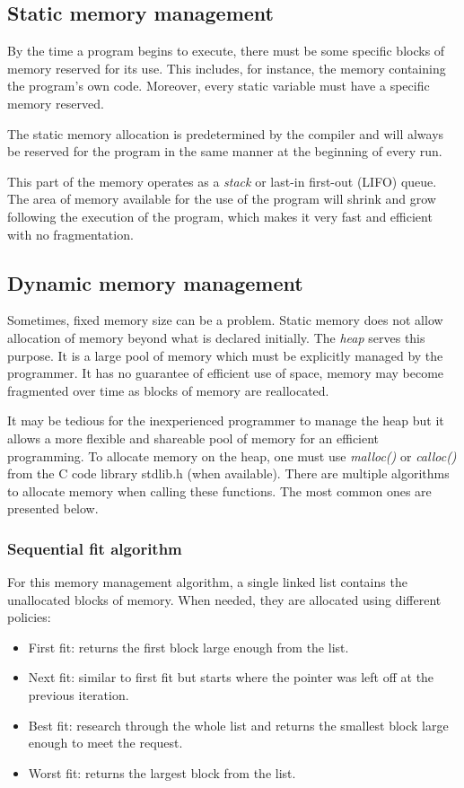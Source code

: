 \subsection{Static memory management}
By the time a program begins to execute, there must be some specific blocks of memory reserved for its use.
This includes, for instance, the memory containing the program's own code.
Moreover, every static variable must have a specific memory reserved.

The static memory allocation is predetermined by the compiler
    and will always be reserved for the program in the same manner at the beginning of every run.

This part of the memory operates as a \textit{stack} or last-in first-out (LIFO) queue.
The area of memory available for the use of the program will shrink and grow following the execution of the program,
which makes it very fast and efficient with no fragmentation.

\subsection{Dynamic memory management}
Sometimes, fixed memory size can be a problem.
Static memory does not allow allocation of memory beyond what is declared initially.
The \textit{heap} serves this purpose.
It is a large pool of memory which must be explicitly managed by the programmer.
It has no guarantee of efficient use of space, memory may become fragmented over time as blocks of memory are reallocated.

It may be tedious for the inexperienced programmer to manage the heap
    but it allows a more flexible and shareable pool of memory for an efficient programming.
To allocate memory on the heap, one must use \textit{malloc()} or \textit{calloc()} from the C code library stdlib.h (when available).
There are multiple algorithms to allocate memory when calling these functions.
The most common ones are presented below\cite{mem-mgmt-algo}.

\subsubsection{Sequential fit algorithm}
For this memory management algorithm, a single linked list contains the unallocated blocks of memory.
When needed, they are allocated using different policies:
\begin{itemize}
    \item First fit: returns the first block large enough from the list.
    \item Next fit: similar to first fit but starts where the pointer was left off at the previous iteration.
    \item Best fit: research through the whole list and returns the smallest block large enough to meet the request.
    \item Worst fit: returns the largest block from the list.
\end{itemize}


